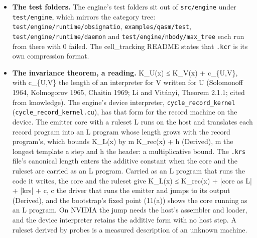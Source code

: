 \begin{enumerate}
\begin{itemize}
\begin{enumerate}
\begin{itemize}
\item \textbf{The test folders.} The engine's test folders sit out of \texttt{src/\allowbreak{}engine} under \texttt{test/\allowbreak{}engine}, which mirrors the category tree: \texttt{test/\allowbreak{}engine/\allowbreak{}runtime/\allowbreak{}obsignatio}, \texttt{examples/\allowbreak{}qasm/\allowbreak{}test}, \texttt{test/\allowbreak{}engine/\allowbreak{}runtime/\allowbreak{}daemon} and \texttt{test/\allowbreak{}engine/\allowbreak{}nbody/\allowbreak{}max\_\allowbreak{}tree} each run from there with 0 failed. The cell\_\allowbreak{}tracking README states that \texttt{.\allowbreak{}kcr} is its own compression format.
\item \textbf{The invariance theorem, a reading.} K\_\allowbreak{}U(x) ≤ K\_\allowbreak{}V(x) + c\_\allowbreak{}\{U,V\}, with c\_\allowbreak{}\{U,V\} the length of an interpreter for V written for U (Solomonoff 1964, Kolmogorov 1965, Chaitin 1969; Li and Vitányi, Theorem 2.1.1; cited from knowledge). The engine's device interpreter, \texttt{cycle\_\allowbreak{}record\_\allowbreak{}kernel} (\texttt{cycle\_\allowbreak{}record\_\allowbreak{}kernel.\allowbreak{}cu}), has that form for the record machine on the device. The emitter core with a ruleset L runs on the host and translates each record program into an L program whose length grows with the record program's, which bounds K\_\allowbreak{}L(x) by m K\_\allowbreak{}rec(x) + h (Derived), m the longest template a step and h the header: a multiplicative bound. The \texttt{.\allowbreak{}krs} file's canonical length enters the additive constant when the core and the ruleset are carried as an L program. Carried as an L program that runs the code it writes, the core and the ruleset give K\_\allowbreak{}L(x) ≤ K\_\allowbreak{}rec(x) + |core as L| + |krs| + c, c the driver that runs the emitter and jumps to its output (Derived), and the bootstrap's fixed point (11(a)) shows the core running as an L program. On NVIDIA the jump needs the host's assembler and loader, and the device interpreter retains the additive form with no host step. A ruleset derived by probes is a measured description of an unknown machine.

\end{itemize}
\end{enumerate}
\end{itemize}
\end{enumerate}
